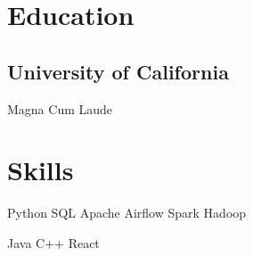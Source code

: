\documentclass[]{devanshu-resume-openfont}
\begin{document}
\begin{minipage}[t]{0.33\textwidth}


\section{Education}

\subsection{University of California}
Magna Cum Laude\\

\sectionsep


\section{Skills}

Python \textbullet{}
SQL \textbullet{}
Apache Airflow \textbullet{}
Spark \textbullet{}
Hadoop \textbullet{}

Java \textbullet{} C++ \textbullet{} React \textbullet{} \\

\sectionsep







\end{minipage}
\end{document}
